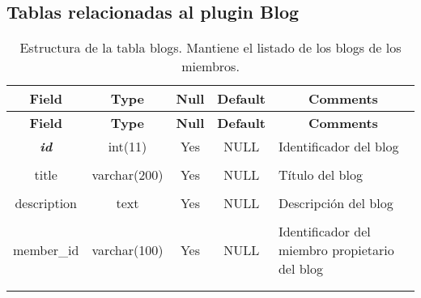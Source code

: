 \subsection{Tablas relacionadas al plugin Blog}
%
%
\begin{longtable}{c c c c l}
	\multicolumn{1}{c}{\textbf{Field}} &
	\multicolumn{1}{c}{\textbf{Type}} &
	\multicolumn{1}{c}{\textbf{Null}} &
	\multicolumn{1}{c}{\textbf{Default}} &
	\multicolumn{1}{c}{\textbf{Comments}} \\ \hline \hline
\endfirsthead
	\multicolumn{1}{c}{\textbf{Field}} &
	\multicolumn{1}{c}{\textbf{Type}} &
	\multicolumn{1}{c}{\textbf{Null}} &
	\multicolumn{1}{c}{\textbf{Default}} &
	\multicolumn{1}{c}{\textbf{Comments}} \\ \hline \hline
\endhead \endfoot
	\textbf{\textit{id}} & int(11) & Yes & NULL & \parbox[t]{0.35\textwidth}{Identificador del blog} \\ \\  \hline
	title & varchar(200) & Yes & NULL & \parbox[t]{0.35\textwidth}{Título del blog} \\ \\  \hline
	description & text & Yes & NULL & \parbox[t]{0.35\textwidth}{Descripción del blog} \\ \\  \hline
	member\_id & varchar(100) & Yes & NULL & \parbox[t]{0.35\textwidth}{Identificador del miembro propietario del blog} \\ \\
\caption[Estructura de la tabla blogs]{Estructura de la tabla blogs. Mantiene el listado de los blogs de los miembros.} \label{tab:blog_blogs-structure} \\
\end{longtable}

